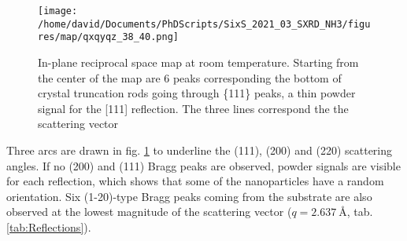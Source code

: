 \begin{figure}[!htb]
    \centering
    \texttt{[image: /home/david/Documents/PhDScripts/SixS\_2021\_03\_SXRD\_NH3/figures/map/qxqyqz\_38\_40.png]}
    \caption{
        In-plane reciprocal space map at room temperature.
        Starting from the center of the map are 6 peaks corresponding the bottom of crystal truncation rods going through \{111\} peaks, a thin powder signal for the [111] reflection.
        The three lines correspond the the scattering vector
    }
    \label{fig:QxQyMap}
\end{figure}

Three arcs are drawn in fig. \ref{fig:QxQyMap} to underline the (111), (200) and (220) scattering angles.
If no (200) and (111) Bragg peaks are observed, powder signals are visible for each reflection, which shows that some of the nanoparticles have a random orientation.
Six (1-20)-type Bragg peaks coming from the  substrate are also observed at the lowest magnitude of the scattering vector ($q = \qty{2.637}{\angstrom}$, tab. \ref{tab:Reflections}).

